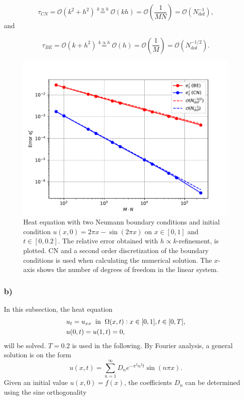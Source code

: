 \begin{equation*}
    \tau_{CN} = \mathcal{O}(k^2 + h^2) \overset{k \propto h} = \mathcal{O}(kh) = \mathcal{O}\left(\frac{1}{MN}\right) = \mathcal{O}(N_{\mathrm{dof}}^{-1}),
\end{equation*}
and 

\begin{equation*}
    \tau_{BE} = \mathcal{O}(k + h^2) \overset{k \propto h} = \mathcal{O}(h) = \mathcal{O}\left(\frac{1}{M}\right) = \mathcal{O}(N_{\mathrm{dof}}^{-1/2}).
\end{equation*}

\begin{figure}[t]
    \centering
    \includegraphics[width = 0.85\linewidth]{plots/rref_BEvsCN1.pdf}
    \caption{Heat equation with two Neumann boundary conditions and initial condition $u(x,0) = 2\pi x - \sin{(2\pi x)}$ on $x \in [0,1]$ and $t \in [0,0.2]$. The relative error obtained with $h \propto k$-refinement, is plotted. CN and a second order discretization of the boundary conditions is used when calculating the numerical solution. The $x$-axis shows the number of degrees of freedom in the linear system.}
    \label{rref_2a}
\end{figure}


\newpage
\subsubsection{b)}
In this subsection, the heat equation 
\begin{equation}
\begin{split}
    &u_t = u_{xx} \hspace{2mm} \text{in} \hspace{2mm} \Omega(x,t): x \in [0,1], t \in [0,T], \\ &u(0,t)=u(1,t)=0,
\label{2b}
\end{split}
\end{equation}
will be solved. $T = 0.2$ is used in the following. By Fourier analysis, a general solution is on the form \cite{Kreyszig}
\begin{equation*}
    u(x,t) = \sum_{n=1}^{\infty} D_n e^{-\pi^2 n^2 t} \sin{(n \pi x)}.
\end{equation*}
Given an initial value $u(x,0)=f(x)$, the coefficients $D_n$ can be determined using the sine orthogonality

